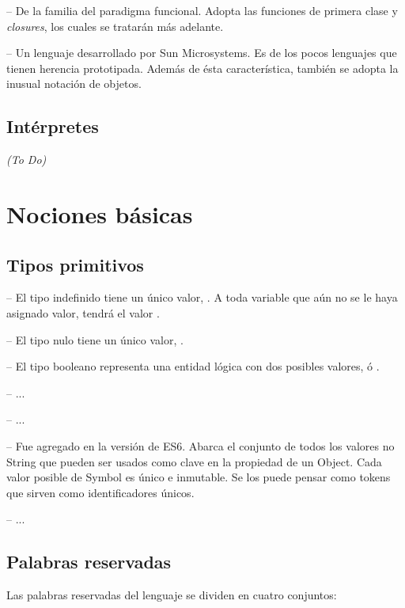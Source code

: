  -- De la familia del paradigma funcional. Adopta las funciones de primera clase y \textit{closures}, los cuales se tratarán más adelante.

 -- Un lenguaje desarrollado por Sun Microsystems. Es de los pocos lenguajes que tienen herencia prototipada. Además de ésta característica, también se adopta la inusual notación de objetos.

\subsection{Intérpretes}

\textit{(To Do)}



\section{Nociones básicas}

\subsection{Tipos primitivos}

 -- El tipo indefinido tiene un único valor, . A toda variable que aún no se le haya asignado valor, tendrá el valor .

 -- El tipo nulo tiene un único valor, .

 -- El tipo booleano representa una entidad lógica con dos posibles valores,  ó .

 -- ...

 -- ...

 -- Fue agregado en la versión de ES6. Abarca el conjunto de todos los valores no String que pueden ser usados como clave en la propiedad de un Object. Cada valor posible de Symbol es único e inmutable. Se los puede pensar como tokens que sirven como identificadores únicos. 

 -- ...


\subsection{Palabras reservadas}

Las palabras reservadas del lenguaje se dividen en cuatro conjuntos:

